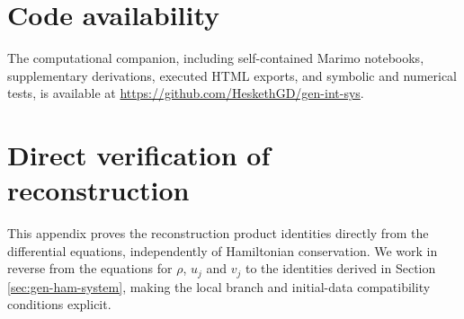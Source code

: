 \documentclass[11pt,a4paper]{article}
\numberwithin{equation}{section}
\begin{document}
\section*{Code availability}

The computational companion, including self-contained Marimo notebooks, supplementary derivations, executed HTML exports, and symbolic and numerical tests, is available at\newline
\url{https://github.com/HeskethGD/gen-int-sys}.

\appendix

\section{Direct verification of reconstruction}
\label{app:direct-reconstruction}

This appendix proves the reconstruction product identities directly from the differential equations, independently of Hamiltonian conservation. We work in reverse from the equations for $\rho$, $u_j$ and $v_j$ to the identities derived in Section \ref{sec:gen-ham-system}, making the local branch and initial-data compatibility conditions explicit.
\end{document}
